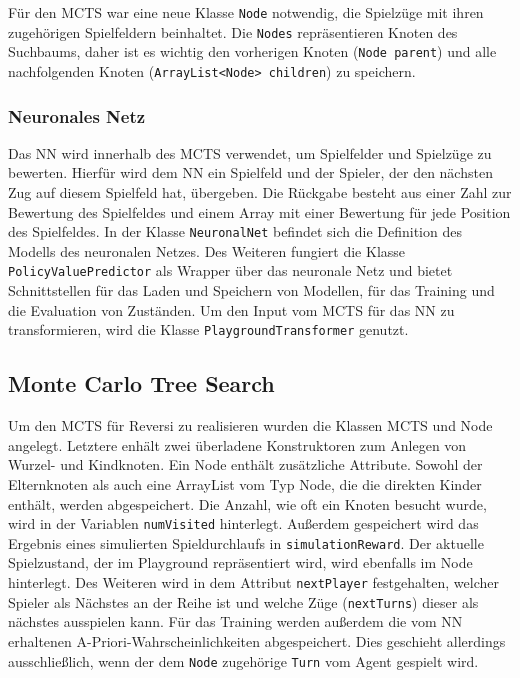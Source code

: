 \documentclass[12pt,a4paper]{article}
\begin{document}
Für den MCTS war eine neue Klasse \texttt{Node} notwendig, die Spielzüge mit ihren zugehörigen Spielfeldern beinhaltet. Die \texttt {Nodes} repräsentieren Knoten des Suchbaums, daher ist es wichtig den vorherigen Knoten (\texttt{Node parent}) und alle nachfolgenden Knoten (\texttt{ArrayList<Node> children}) zu speichern.

\subsubsection{Neuronales Netz}
Das NN wird innerhalb des MCTS verwendet, um Spielfelder und Spielzüge zu bewerten. Hierfür wird dem NN ein Spielfeld und der Spieler, der den nächsten Zug auf diesem Spielfeld hat, übergeben. Die Rückgabe besteht aus einer Zahl zur Bewertung des Spielfeldes und einem Array mit einer Bewertung für jede Position des Spielfeldes. In der Klasse \texttt{NeuronalNet} befindet sich die Definition des Modells des neuronalen Netzes. Des Weiteren fungiert die Klasse \texttt{PolicyValuePredictor} als Wrapper über das neuronale Netz und bietet Schnittstellen für das Laden und Speichern von Modellen, für das Training und die Evaluation von Zuständen. Um den Input vom MCTS für das NN zu transformieren, wird die Klasse \texttt{PlaygroundTransformer} genutzt. 

\subsection{Monte Carlo Tree Search}\label{MCTS}
Um den MCTS für Reversi zu realisieren wurden die Klassen MCTS und Node angelegt. Letztere enhält zwei überladene Konstruktoren zum Anlegen von Wurzel- und Kindknoten. Ein Node enthält zusätzliche Attribute. Sowohl der Elternknoten als auch eine ArrayList vom Typ Node, die die direkten Kinder enthält, werden abgespeichert. Die Anzahl, wie oft ein Knoten besucht wurde, wird in der Variablen \texttt{numVisited} hinterlegt. Außerdem gespeichert wird das Ergebnis eines simulierten Spieldurchlaufs in \texttt{simulationReward}. Der aktuelle Spielzustand, der im Playground repräsentiert wird, wird ebenfalls im Node hinterlegt. Des Weiteren wird in dem Attribut \texttt{nextPlayer} festgehalten, welcher Spieler als Nächstes an der Reihe ist und welche Züge (\texttt{nextTurns}) dieser als nächstes ausspielen kann. Für das Training werden außerdem die vom NN erhaltenen A-Priori-Wahrscheinlichkeiten abgespeichert. Dies geschieht allerdings ausschließlich, wenn der dem \texttt{Node} zugehörige \texttt{Turn} vom Agent gespielt wird.
\end{document}

